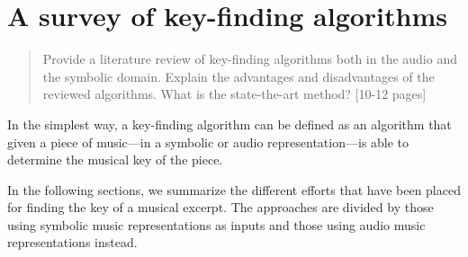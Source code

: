 
\chapter{A survey of key-finding algorithms}
\label{chap:chap30}

\begin{quote}
    Provide a literature review of key-finding algorithms both in the audio and the symbolic domain. Explain the advantages and disadvantages of the reviewed algorithms. What is the state-the-art method? [10-12 pages]
\end{quote}
\clearpage



In the simplest way, a key-finding algorithm can be defined as an algorithm that given a piece of music---in a symbolic or audio representation---is able to determine the musical key of the piece.

In the following sections, we summarize the different efforts that have been placed for finding the key of a musical excerpt. The approaches are divided by those using symbolic music representations as inputs and those using audio music representations instead.



